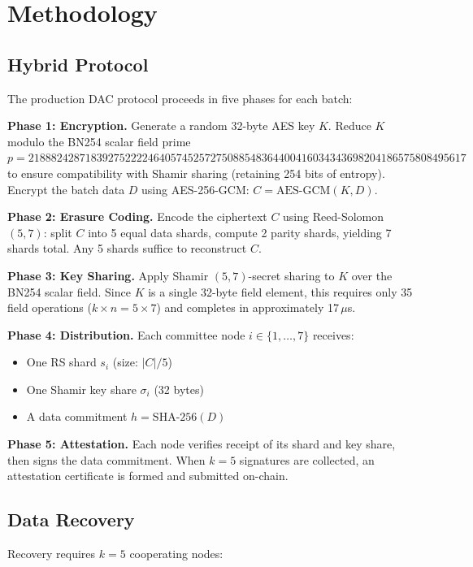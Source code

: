 
\section{Methodology}
\label{sec:methodology}

\subsection{Hybrid Protocol}

The production DAC protocol proceeds in five phases for each batch:

\textbf{Phase 1: Encryption.}
Generate a random 32-byte AES key $K$. Reduce $K$ modulo the BN254
scalar field prime $p = 21888242871839275222246405745257275088548364400416034343698204186575808495617$
to ensure compatibility with Shamir sharing (retaining 254 bits of
entropy). Encrypt the batch data $D$ using AES-256-GCM:
$C = \text{AES-GCM}(K, D)$.

\textbf{Phase 2: Erasure Coding.}
Encode the ciphertext $C$ using Reed-Solomon $(5,7)$: split $C$ into 5
equal data shards, compute 2 parity shards, yielding 7 shards total.
Any 5 shards suffice to reconstruct $C$.

\textbf{Phase 3: Key Sharing.}
Apply Shamir $(5,7)$-secret sharing to $K$ over the BN254 scalar field.
Since $K$ is a single 32-byte field element, this requires only 35
field operations ($k \times n = 5 \times 7$) and completes in
approximately 17\,$\mu$s.

\textbf{Phase 4: Distribution.}
Each committee node $i \in \{1, \ldots, 7\}$ receives:
\begin{itemize}
  \item One RS shard $s_i$ (size: $|C| / 5$)
  \item One Shamir key share $\sigma_i$ (32 bytes)
  \item A data commitment $h = \text{SHA-256}(D)$
\end{itemize}

\textbf{Phase 5: Attestation.}
Each node verifies receipt of its shard and key share, then signs the
data commitment. When $k = 5$ signatures are collected, an attestation
certificate is formed and submitted on-chain.

\subsection{Data Recovery}

Recovery requires $k = 5$ cooperating nodes:

